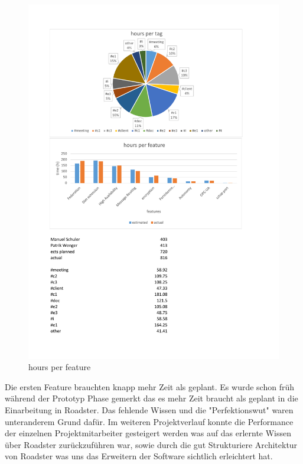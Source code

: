 \begin{figure}[]
	\includegraphics[trim=2cm 12cm 3.5cm 11.5cm, clip=true, width=\textwidth]{img/project_monitoring_diagrams.pdf}
	\caption{hours per feature}
	\label{fig:hours:per:feature}
\end{figure}

Die ersten Feature brauchten knapp mehr Zeit als geplant. Es wurde schon früh während der Prototyp Phase
gemerkt das es mehr Zeit braucht als geplant in die Einarbeitung in Roadster. Das fehlende Wissen und
die "Perfektionswut" waren unteranderem Grund dafür.
Im weiteren Projektverlauf konnte die Performance der einzelnen Projektmitarbeiter gesteigert werden
was auf das erlernte Wissen über Roadster zurückzuführen war, sowie durch die gut
Strukturiere Architektur von Roadster was uns das Erweitern der Software sichtlich erleichtert hat.


